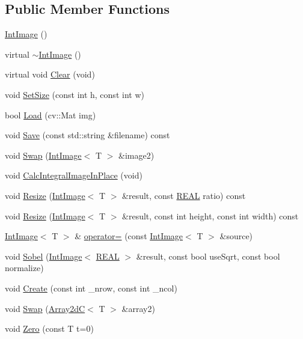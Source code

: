 \subsection*{Public Member Functions}
\begin{DoxyCompactItemize}
\item 
\mbox{\hyperlink{class_int_image_ad5fa7989718f9d3b64f81f2895ffc07f}{Int\+Image}} ()
\item 
virtual \mbox{\hyperlink{class_int_image_a5b0fb4fe568e219d01c3b882972e3c77}{$\sim$\+Int\+Image}} ()
\item 
virtual void \mbox{\hyperlink{class_int_image_a183a2bb5b576ab7a03010c0fff8f47cb}{Clear}} (void)
\item 
void \mbox{\hyperlink{class_int_image_a89eb8fac3fde8d3ce392e5f28c14f8b0}{Set\+Size}} (const int h, const int w)
\item 
bool \mbox{\hyperlink{class_int_image_a9e74890b8f45d03e0c4aa335a96849d1}{Load}} (cv\+::\+Mat img)
\item 
void \mbox{\hyperlink{class_int_image_a6afc3c902400a1c287206b0f25604bab}{Save}} (const std\+::string \&filename) const
\item 
void \mbox{\hyperlink{class_int_image_adc366f59865cefd440c01996fd42d59a}{Swap}} (\mbox{\hyperlink{class_int_image}{Int\+Image}}$<$ T $>$ \&image2)
\item 
void \mbox{\hyperlink{class_int_image_a4b955bc5382ee4745a5ab92fc48b4a6a}{Calc\+Integral\+Image\+In\+Place}} (void)
\item 
void \mbox{\hyperlink{class_int_image_a6eb852d06d8365476dba0760d9319e59}{Resize}} (\mbox{\hyperlink{class_int_image}{Int\+Image}}$<$ T $>$ \&result, const \mbox{\hyperlink{c4-pedestrian-detector_8h_a5821460e95a0800cf9f24c38915cbbde}{R\+E\+AL}} ratio) const
\item 
void \mbox{\hyperlink{class_int_image_a280423236cc08aca573725950e913467}{Resize}} (\mbox{\hyperlink{class_int_image}{Int\+Image}}$<$ T $>$ \&result, const int height, const int width) const
\item 
\mbox{\hyperlink{class_int_image}{Int\+Image}}$<$ T $>$ \& \mbox{\hyperlink{class_int_image_a03a3f6df469a4c8569612cd0df0ff345}{operator=}} (const \mbox{\hyperlink{class_int_image}{Int\+Image}}$<$ T $>$ \&source)
\item 
void \mbox{\hyperlink{class_int_image_a35b8a5c2e64fa3ab50d6b14973f368b8}{Sobel}} (\mbox{\hyperlink{class_int_image}{Int\+Image}}$<$ \mbox{\hyperlink{c4-pedestrian-detector_8h_a5821460e95a0800cf9f24c38915cbbde}{R\+E\+AL}} $>$ \&result, const bool use\+Sqrt, const bool normalize)
\item 
void \mbox{\hyperlink{class_array2d_c_abfe87be7641dfc586b9e7bffebcca9ec}{Create}} (const int \+\_\+nrow, const int \+\_\+ncol)
\item 
void \mbox{\hyperlink{class_array2d_c_ae8cbeb3e4fdc3a45cc188ecc1b317919}{Swap}} (\mbox{\hyperlink{class_array2d_c}{Array2dC}}$<$ T $>$ \&array2)
\item 
void \mbox{\hyperlink{class_array2d_c_a5e1d7837fd208699694fc3fc97151df0}{Zero}} (const T t=0)
\end{DoxyCompactItemize}
